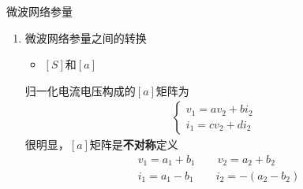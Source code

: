 \begin{frame}{微波网络参量}
    \begin{enumerate}
        \resume
        \item 微波网络参量之间的转换
              \begin{itemize}
                  \item $[S]$和$[a]$
              \end{itemize}
              归一化电流电压构成的$[a]$矩阵为
              \begin{align*}
                  \begin{cases}
                      v_1=av_2+bi_2 \\
                      i_1=cv_2+di_2
                  \end{cases}
              \end{align*}
              很明显，$[a]$矩阵是\textbf{不对称}定义
              \begin{align*}
                   & v_1=a_1+b_1 \qquad v_2=a_2+b_2    \\
                   & i_1=a_1-b_1 \qquad i_2=-(a_2-b_2)
              \end{align*}
    \end{enumerate}
\end{frame}

